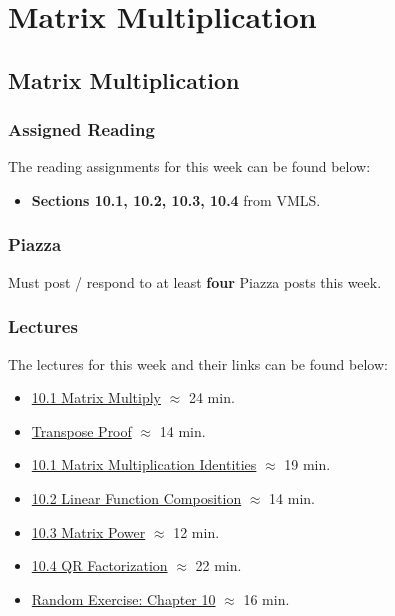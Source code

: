 \clearpage

\renewcommand{\ChapTitle}{Matrix Multiplication}
\renewcommand{\SectionTitle}{Matrix Multiplication}

\chapter{\ChapTitle}
\section{\SectionTitle}

\subsection{Assigned Reading}

The reading assignments for this week can be found below:

\begin{itemize}
    \item \textbf{Sections 10.1, 10.2, 10.3, 10.4} from VMLS.
\end{itemize}

\subsection{Piazza}

Must post / respond to at least \textbf{four} Piazza posts this week.  

\subsection{Lectures}

The lectures for this week and their links can be found below:

\begin{itemize}
    \item \href{https://applied.cs.colorado.edu/mod/hvp/view.php?id=50788}{10.1 Matrix Multiply} $\approx$ 24 min.
    \item \href{https://applied.cs.colorado.edu/mod/hvp/view.php?id=50789}{Transpose Proof} $\approx$ 14 min.
    \item \href{https://applied.cs.colorado.edu/mod/hvp/view.php?id=50790}{10.1 Matrix Multiplication Identities} $\approx$ 19 min.
    \item \href{https://applied.cs.colorado.edu/mod/hvp/view.php?id=50791}{10.2 Linear Function Composition} $\approx$ 14 min.
    \item \href{https://applied.cs.colorado.edu/mod/hvp/view.php?id=50792}{10.3 Matrix Power} $\approx$ 12 min.
    \item \href{https://applied.cs.colorado.edu/mod/hvp/view.php?id=50793}{10.4 QR Factorization} $\approx$ 22 min.
    \item \href{https://applied.cs.colorado.edu/mod/hvp/view.php?id=50794}{Random Exercise: Chapter 10} $\approx$ 16 min.
\end{itemize}

